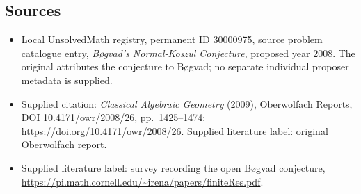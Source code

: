 \documentclass[11pt]{article}
\begin{document}
\subsection{Sources}
\begin{itemize}\item Local UnsolvedMath registry, permanent ID 30000975, source problem catalogue entry, \emph{Bøgvad's Normal-Koszul Conjecture}, proposed year 2008. The original attributes the conjecture to Bøgvad; no separate individual proposer metadata is supplied.\item Supplied citation: \emph{Classical Algebraic Geometry} (2009), Oberwolfach Reports, DOI 10.4171/owr/2008/26, pp.\ 1425--1474: \url{https://doi.org/10.4171/owr/2008/26}. Supplied literature label: original Oberwolfach report.\item Supplied literature label: survey recording the open Bøgvad conjecture, \url{https://pi.math.cornell.edu/~irena/papers/finiteRes.pdf}.\end{itemize}
\end{document}
